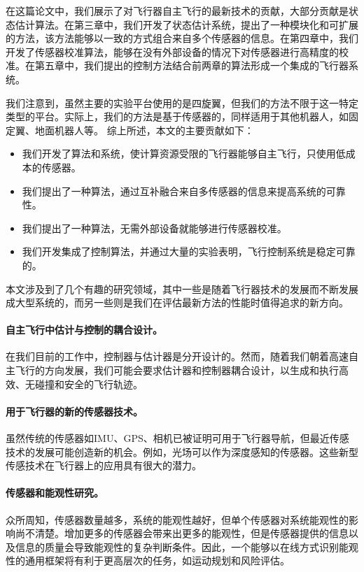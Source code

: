 \documentclass[
  type=master
]{gdutthesis}
\begin{document}
\gdutbackmatter
{}
在这篇论文中，我们展示了对飞行器自主飞行的最新技术的贡献，大部分贡献是状态估计算法。在第三章中，我们开发了状态估计系统，提出了一种模块化和可扩展的方法，该方法能够以一致的方式组合来自多个传感器的信息。在第四章中，我们开发了传感器校准算法，能够在没有外部设备的情况下对传感器进行高精度的校准。在第五章中，我们提出的控制方法结合前两章的算法形成一个集成的飞行器系统。\par
我们注意到，虽然主要的实验平台使用的是四旋翼，但我们的方法不限于这一特定类型的平台。实际上，我们的方法是基于传感器的，同样适用于其他机器人，如固定翼、地面机器人等。
综上所述，本文的主要贡献如下：
\begin{itemize}
	\item 我们开发了算法和系统，使计算资源受限的飞行器能够自主飞行，只使用低成本的传感器。
	\item 我们提出了一种算法，通过互补融合来自多传感器的信息来提高系统的可靠性。
	\item 我们提出了一种算法，无需外部设备就能够进行传感器校准。
	\item 我们开发集成了控制算法，并通过大量的实验表明，飞行控制系统是稳定可靠的。
\end{itemize}

本文涉及到了几个有趣的研究领域，其中一些是随着飞行器技术的发展而不断发展成大型系统的，而另一些则是我们在评估最新方法的性能时值得追求的新方向。
\paragraph{自主飞行中估计与控制的耦合设计。}
在我们目前的工作中，控制器与估计器是分开设计的。然而，随着我们朝着高速自主飞行的方向发展，我们可能会要求估计器和控制器耦合设计，以生成和执行高效、无碰撞和安全的飞行轨迹。
\paragraph{用于飞行器的新的传感器技术。}
虽然传统的传感器如IMU、GPS、相机已被证明可用于飞行器导航，但最近传感技术的发展可能创造新的机会。例如，光场可以作为深度感知的传感器。这些新型传感技术在飞行器上的应用具有很大的潜力。
\paragraph{传感器和能观性研究。}
众所周知，传感器数量越多，系统的能观性越好，但单个传感器对系统能观性的影响尚不清楚。增加更多的传感器会带来出更多的能观性，但是传感器提供的信息以及信息的质量会导致能观性的复杂判断条件。因此，一个能够以在线方式识别能观性的通用框架将有利于更高层次的任务，如运动规划和风险评估。
\end{document}
